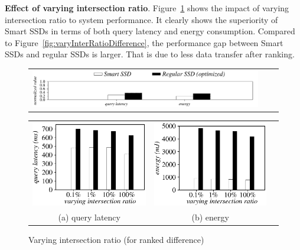



\textbf{Effect of varying intersection ratio}.
Figure~\ref{fig:varyInterRatioRankDifference} shows the impact of varying intersection ratio to system performance.
It clearly shows the superiority of Smart SSDs in terms of both query latency and energy consumption. Compared to Figure~\ref{fig:varyInterRatioDifference}, the performance gap between Smart SSDs and regular SSDs is larger. That is due to less data transfer after ranking.
 \begin{figure}[tbp]
\centering
\begin{tabular}{ccc}
\includegraphics[width=0.52\columnwidth]{figures/banner2.pdf}
\end{tabular}
\vspace{-0.1cm}
\renewcommand{\tabcolsep}{0.1mm}
\begin{tabular}{ccc}
\includegraphics[width=0.5\columnwidth]{figures/RankDifference-time-VaryInterRatio-equal.eps}&
\includegraphics[width=0.5\columnwidth]{figures/RankDifference-energy-VaryInterRatio-equal.eps}\\
(a) query latency & (b) energy
\end{tabular}
\caption{Varying intersection ratio (for ranked difference)}
\label{fig:varyInterRatioRankDifference}
\end{figure}


